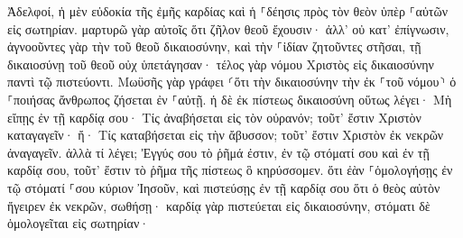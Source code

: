\documentclass{openreader}
\begin{document}
Ἀδελφοί, ἡ μὲν εὐδοκία τῆς ἐμῆς καρδίας καὶ ἡ ⸀δέησις πρὸς τὸν θεὸν ὑπὲρ ⸀αὐτῶν εἰς σωτηρίαν. 
μαρτυρῶ γὰρ αὐτοῖς ὅτι ζῆλον θεοῦ ἔχουσιν· ἀλλ’ οὐ κατ’ ἐπίγνωσιν, 
ἀγνοοῦντες γὰρ τὴν τοῦ θεοῦ δικαιοσύνην, καὶ τὴν ⸀ἰδίαν ζητοῦντες στῆσαι, τῇ δικαιοσύνῃ τοῦ θεοῦ οὐχ ὑπετάγησαν· 
τέλος γὰρ νόμου Χριστὸς εἰς δικαιοσύνην παντὶ τῷ πιστεύοντι. 
Μωϋσῆς γὰρ γράφει ⸂ὅτι τὴν δικαιοσύνην τὴν ἐκ ⸀τοῦ νόμου⸃ ὁ ⸀ποιήσας ἄνθρωπος ζήσεται ἐν ⸀αὐτῇ. 
ἡ δὲ ἐκ πίστεως δικαιοσύνη οὕτως λέγει· Μὴ εἴπῃς ἐν τῇ καρδίᾳ σου· Τίς ἀναβήσεται εἰς τὸν οὐρανόν; τοῦτ’ ἔστιν Χριστὸν καταγαγεῖν· 
ἤ· Τίς καταβήσεται εἰς τὴν ἄβυσσον; τοῦτ’ ἔστιν Χριστὸν ἐκ νεκρῶν ἀναγαγεῖν. 
ἀλλὰ τί λέγει; Ἐγγύς σου τὸ ῥῆμά ἐστιν, ἐν τῷ στόματί σου καὶ ἐν τῇ καρδίᾳ σου, τοῦτ’ ἔστιν τὸ ῥῆμα τῆς πίστεως ὃ κηρύσσομεν. 
ὅτι ἐὰν ⸀ὁμολογήσῃς ἐν τῷ στόματί ⸀σου κύριον Ἰησοῦν, καὶ πιστεύσῃς ἐν τῇ καρδίᾳ σου ὅτι ὁ θεὸς αὐτὸν ἤγειρεν ἐκ νεκρῶν, σωθήσῃ· 
καρδίᾳ γὰρ πιστεύεται εἰς δικαιοσύνην, στόματι δὲ ὁμολογεῖται εἰς σωτηρίαν· 
\end{document}
